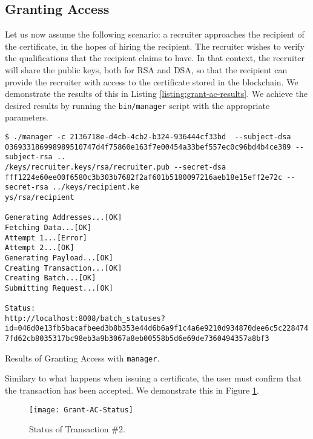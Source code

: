 \subsection{Granting Access}
\label{sec:impl-grant-ac}

Let us now assume the following scenario: a recruiter approaches the recipient of the certificate, in the hopes of hiring the recipient. The recruiter wishes to verify the qualifications that the recipient claims to have. In that context, the recruiter will share the public keys, both for RSA and DSA, so that the recipient can provide the recruiter with access to the certificate stored in the blockchain. We demonstrate the results of this in Listing \ref{listing:grant-ac-results}. We achieve the desired results by running the \texttt{bin/manager} script with the appropriate parameters.

\begin{listing}[ht]
	\begin{verbatim}
$ ./manager -c 2136718e-d4cb-4cb2-b324-936444cf33bd  --subject-dsa 036933186998989510747d4f75860e163f7e00454a33bef557ec0c96bd4b4ce389 --subject-rsa ..
/keys/recruiter.keys/rsa/recruiter.pub --secret-dsa fff1224e60ee00f6580c3b303b7682f2af601b5180097216aeb18e15eff2e72c --secret-rsa ../keys/recipient.ke
ys/rsa/recipient

Generating Addresses...[OK]
Fetching Data...[OK]
Attempt 1...[Error]
Attempt 2...[OK]
Generating Payload...[OK]
Creating Transaction...[OK]
Creating Batch...[OK]
Submitting Request...[OK]

Status:
http://localhost:8008/batch_statuses?id=046d0e13fb5bacafbeed3b8b353e44d6b6a9f1c4a6e9210d934870dee6c5c228474
7fd62cb8035317bc98eb3a9b3067a8eb00558b5d6e69de7360494357a8bf3
\end{verbatim}
	\caption{Results of Granting Access with \texttt{manager}.}
	\label{listing:grant-ac-results}
\end{listing}

Similary to what happens when issuing a certificate, the user must confirm that the transaction has been accepted. We demonstrate this in Figure \ref{fig:grant-ac-status}.

\begin{figure}[htb]
	\centering
	\texttt{[image: Grant-AC-Status]}
	\caption{Status of Transaction \#2.}
	\label{fig:grant-ac-status}
\end{figure}

